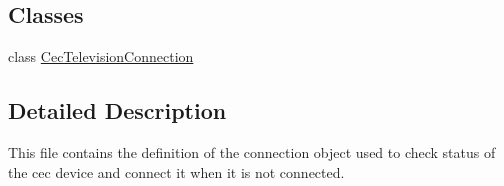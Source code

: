\subsection*{Classes}
\begin{DoxyCompactItemize}
\item 
class \hyperlink{classCecTelevisionConnection}{Cec\+Television\+Connection}
\end{DoxyCompactItemize}


\subsection{Detailed Description}
This file contains the definition of the connection object used to check status of the cec device and connect it when it is not connected. 

